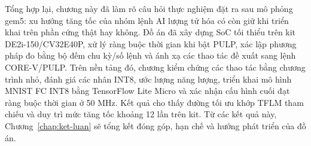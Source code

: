 \documentclass[../DoAn.tex]{subfiles}
\begin{document}
Tổng hợp lại, chương này đã làm rõ câu hỏi thực nghiệm đặt ra sau mô phỏng gem5: xu hướng tăng tốc của nhóm lệnh AI lượng tử hóa có còn giữ khi triển khai trên phần cứng thật hay không. Đồ án đã xây dựng SoC tối thiểu trên kit DE2i-150/CV32E40P, xử lý ràng buộc thời gian khi bật PULP, xác lập phương pháp đo bằng bộ đếm chu kỳ/số lệnh và ánh xạ các thao tác đề xuất sang lệnh CORE-V/PULP. Trên nền tảng đó, chương kiểm chứng các thao tác bằng chương trình nhỏ, đánh giá các nhân INT8, ước lượng năng lượng, triển khai mô hình MNIST FC INT8 bằng TensorFlow Lite Micro và xác nhận cấu hình cuối đạt ràng buộc thời gian ở 50 MHz. Kết quả cho thấy đường tối ưu khớp TFLM tham chiếu và duy trì mức tăng tốc khoảng 12 lần trên kit. Từ các kết quả này, Chương~\ref{chap:ket-luan} sẽ tổng kết đóng góp, hạn chế và hướng phát triển của đồ án.
\end{document}
